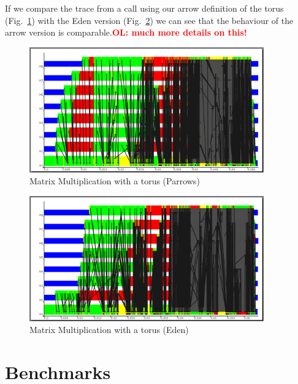 \documentclass{jfp1}
\newcommand{\comm}[2]{\textcolor{red}{\bfseries #1: #2}}
\newcommand{\olcomment}[1]{\comm{OL}{#1}}
\begin{document}
If we compare the trace from a call using our arrow definition of the torus (Fig.~\ref{fig:torus_parrows_trace}) with the Eden version (Fig.~\ref{fig:torus_eden_trace}) we can see that the behaviour of the arrow version is comparable.\olcomment{much more details on this!}
\begin{figure}[ht]
	\centering
	\includegraphics[width=0.9\textwidth]{images/torus_matrix_parrows_scale}
	\caption[Matrix Multiplication with a torus (Parrows)]{Matrix Multiplication with a torus (Parrows)}
	\label{fig:torus_parrows_trace}
\end{figure}

\begin{figure}[ht]
	\centering
	\includegraphics[width=0.9\textwidth]{images/torus_matrix_eden_scale}
	\caption[Matrix Multiplication with a torus (Eden)]{Matrix Multiplication with a torus (Eden)}
	\label{fig:torus_eden_trace}
\end{figure}

\FloatBarrier

	\section{Benchmarks}
\label{sec:benchmarks}
\end{document}
